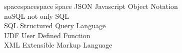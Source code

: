 
\begin{tabbing}
spacespacespace \= space \kill
JSON	 \> 	Javascript Object Notation \\
noSQL	 \> 	not only SQL \\
SQL	 	\> 		Structured Query Language \\
UDF	 	\> 		User Defined Function \\
XML	 	\>	 	Extensible Markup Language \\

\end{tabbing}
\endinput
